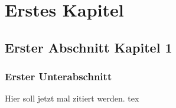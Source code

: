 \chapter{Erstes Kapitel}
\section{Erster Abschnitt Kapitel 1}
\subsection{Erster Unterabschnitt }
Hier soll jetzt mal zitiert werden. \cite{av:1a}
\texorpdfstring{tex}{pdf}